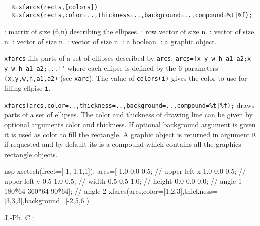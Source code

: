 
\begin{mandesc}
  \\ %
\end{mandesc}
\begin{calling_sequence}
\begin{verbatim}
  R=xfarcs(rects,[colors])
  R=xfarcs(rects,color=..,thickness=..,background=..,compound=%t|%f);
\end{verbatim}
\end{calling_sequence}

\begin{parameters}
  \begin{varlist}
    : matrix of size (6,n) describing the ellipses.
    : row vector of size n.
    : vector of size n.
    : vector of size n.
    : vector of size n.
    : a boolean.
    : a graphic object.
  \end{varlist}
\end{parameters}

\begin{mandescription}
  \verb!xfarcs! fills parts of a set of ellipses described by \verb!arcs!: 
  \verb!arcs=[x y w h a1 a2;x y w h a1 a2;...]'! where each ellipse is defined 
  by the 6 parameters \verb!(x,y,w,h,a1,a2)! (see \verb!xarc!).
  The value of \verb!colors(i)! gives the color to use for filling ellpise \verb!i!.

  \verb!xfarcs(arcs,color=..,thickness=..,background=..,compound=%t|%f);! 
  draws parts of a set of ellipses. The color and thickness of drawing line can be given by optional arguments
  color and thickness. If optional background argument is given it is used as color to fill
  the rectangle. A graphic object is returned in argument \verb!R! if requested and by default
  its is a compound which contains all the graphics rectangle objects.
\end{mandescription}

\begin{examples}
  \begin{mintednsp}{nsp}
    xsetech(frect=[-1,-1,1,1]);
    arcs=[-1.0 0.0 0.5; // upper left x
           1.0 0.0 0.5; // upper left y
           0.5 1.0 0.5; // width
           0.5 0.5 1.0; // height
           0.0 0.0 0.0; // angle 1
           180*64 360*64 90*64]; // angle 2
    xfarcs(arcs,color=[1,2,3],thickness=[3,3,3],background=[-2,5,6])
  \end{mintednsp}
\end{examples}

\begin{manseealso}
     
\end{manseealso}


\begin{authors}
  J.-Ph. C.;   
\end{authors}

